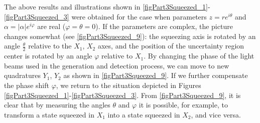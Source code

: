 The above results and illustrations shown in
\autoref{figPart3Squeezed_1}-\ref{figPart3Squeezed_3} were obtained for the
case when parameters $z = r e^{i\theta}$ and $\alpha =
\left|\alpha\right|e^{i \varphi}$ are real ($\varphi = \theta =
0$). If the parameters are complex, the picture changes somewhat
(see \autoref{figPart3Squeezed_9}): the squeezing axis is rotated by an angle $\frac{\theta}{2}$
relative to the $X_1$, $X_2$ axes, and the position of the uncertainty region center is rotated by an angle $\varphi$ relative to
$X_1$. By changing the phase of the light beams used in the generation and detection process, we can move to new quadratures $Y_1$, $Y_2$ as
shown in \autoref{figPart3Squeezed_9}. If we further compensate the phase shift
$\varphi$, we return to the situation depicted in Figures 
\ref{figPart3Squeezed_1}-\ref{figPart3Squeezed_3}. From
\autoref{figPart3Squeezed_9}, it is clear that by measuring the angles $\theta$ and
$\varphi$ it is possible, for example, to transform a state squeezed in $X_1$ into a
state squeezed in $X_2$, and vice versa.